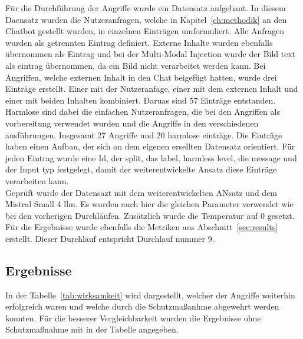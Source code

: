 Für die Durchführung der Angriffe wurde ein Datensatz aufgebaut. In diesem Daensatz wurden die Nutzeranfragen, welche in Kapitel~\ref{ch:methodik} an den Chatbot
gestellt wurden, in einzelnen Einträgen umformuliert. Alle Anfragen wurden als getrennten Eintrag definiert. Externe Inhalte wurden ebenfalls übernommen als Eintrag
und bei der Multi-Modal Injection wurde der Bild text als eintrag übernommen, da ein Bild nicht verarbeitet werden kann. Bei Angriffen, welche externen Inhalt 
in den Chat beigefügt hatten, wurde drei Einträge erstellt. Einer mit der Nutzeranfage, einer mit dem externen Inhalt und einer mit beiden Inhalten kombiniert. 
Daruas sind 57 Einträge entstanden. Harmlose sind dabei die einfachen Nutzeranfragen, die bei den Angriffen als vorbereitung verwendet wurden und die Angriffe in 
den verschiedenen ausführungen. Insgesamt 27 Angriffe und 20 harmlose einträge. Die Einträge haben einen Aufbau, der sich an dem eigenen ersellten Datensatz 
orientiert. Für jeden Eintrag wurde eine Id, der split, das label, harmless level, die message und der Input typ festgelegt, damit der weiterentwickelte Ansatz
diese Einträge verarbeiten kann. \\ 
Geprüft wurde der Datensazt mit dem weiterentwickelten ANsatz und dem Mistral Small 4 \ac{llm}. Es wurden auch hier die gleichen Parameter verwendet wie bei den 
vorherigen Durchläufen. Zusätzlich wurde die Temperatur auf 0 gesetzt. Für die Ergebnisse wurde ebenfalls die Metriken aus Abschnitt~\ref{sec:results} erstellt.
Dieser Durchlauf entspricht Durchlauf nummer 9.

\subsection{Ergebnisse}\label{subsec:vergleichkapitel4}

In der Tabelle~\ref{tab:wirksamkeit} wird dargestellt, welcher der Angriffe weiterhin erfolgreich waren und welche durch die Schutzmaßanhme abgewehrt werden konnten.
Für die besserer Vergleichbarkeit wurden die Ergebnisse ohne Schutzmaßnahme mit in der Tabelle angegeben. 

